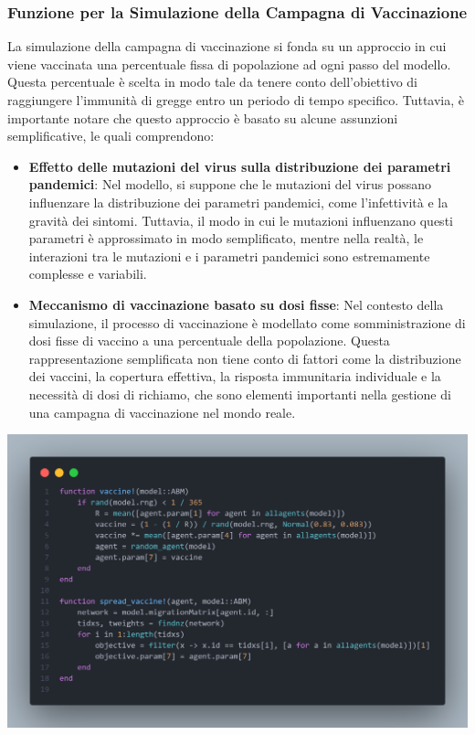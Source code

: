 \subsubsection{Funzione per la Simulazione della Campagna di Vaccinazione}

La simulazione della campagna di vaccinazione si fonda su un approccio 
in cui viene vaccinata una percentuale fissa di popolazione ad ogni 
passo del modello. Questa percentuale è scelta in modo tale da tenere 
conto dell'obiettivo di raggiungere l'immunità di gregge entro un 
periodo di tempo specifico. Tuttavia, è importante notare che questo 
approccio è basato su alcune assunzioni semplificative, le quali 
comprendono:

\begin{itemize}
	\item \textbf{Effetto delle mutazioni del virus sulla distribuzione
	dei parametri pandemici}: Nel modello, si suppone che le mutazioni 
	del virus possano influenzare la distribuzione dei parametri 
	pandemici, come l'infettività e la gravità dei sintomi. 
	Tuttavia, il modo in cui le mutazioni influenzano questi parametri 
	è approssimato in modo semplificato, mentre nella realtà, 
	le interazioni tra le mutazioni e i parametri pandemici sono 
	estremamente complesse e variabili.
	\item \textbf{Meccanismo di vaccinazione basato su dosi fisse}: Nel 
	contesto della simulazione, il processo di vaccinazione è modellato 
	come somministrazione di dosi fisse di vaccino a una percentuale 
	della popolazione. Questa rappresentazione semplificata non tiene 
	conto di fattori come la distribuzione dei vaccini, la copertura 
	effettiva, la risposta immunitaria individuale e la necessità di 
	dosi di richiamo, che sono elementi importanti nella gestione di 
	una campagna di vaccinazione nel mondo reale.
\end{itemize}

\begin{minipage}{\linewidth}
	\centering
	\includegraphics[width=\textwidth]{img/vaccine.png}
	\label{fig:vaccine}
\end{minipage}

